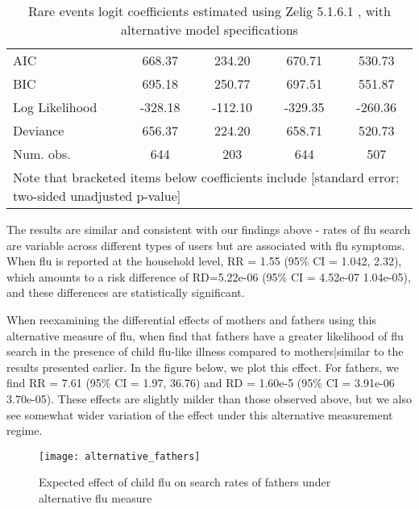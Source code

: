 \documentclass[12pt]{article}
\begin{document}
\begin{table}[h!]
\begin{center}
\begin{tabular}{l c c c c }
\hline
AIC            & 668.37          & 234.20          & 670.71          & 530.73          \\
BIC            & 695.18          & 250.77          & 697.51          & 551.87          \\
Log Likelihood & -328.18         & -112.10         & -329.35         & -260.36         \\
Deviance       & 656.37          & 224.20          & 658.71          & 520.73          \\
Num. obs.      & 644             & 203             & 644             & 507             \\
\hline
\multicolumn{5}{l}{\scriptsize{Note that bracketed items below coefficients include [standard error; two-sided unadjusted p-value]}}
\end{tabular}
\caption{Rare events logit coefficients estimated using Zelig 5.1.6.1 \citep{choirat_etal_2020}, with alternative model specifications}
\label{table:coefficients}
\end{center}
\end{table}

The results are similar and consistent with our findings above - rates of flu search are variable across different types of users but are associated with flu symptoms. When flu is reported at the household level, RR = 1.55 (95\% CI = 1.042, 2.32), which amounts to a risk difference of RD=5.22e-06 (95\% CI = 4.52e-07 1.04e-05), and these differences are statistically significant.   

When reexamining the differential effects of mothers and fathers using this alternative measure of flu, when find that fathers have a greater likelihood of flu search in the presence of child flu-like illness compared to mothers|similar to the results presented earlier. In the figure below, we plot this effect. For fathers, we find RR = 7.61 (95\% CI = 1.97, 36.76) and RD = 1.60e-5 (95\% CI = 3.91e-06 3.70e-05). These effects are slightly milder than those observed above, but we also see somewhat wider variation of the effect under this alternative measurement regime. %

\begin{figure}[!htbp]
\begin{centering}
   \texttt{[image: alternative\_fathers]}
  \caption{Expected effect of child flu on search rates of fathers under alternative flu measure}
\label{alt_fathers}
\end{centering}
\end{figure}
\end{document}
